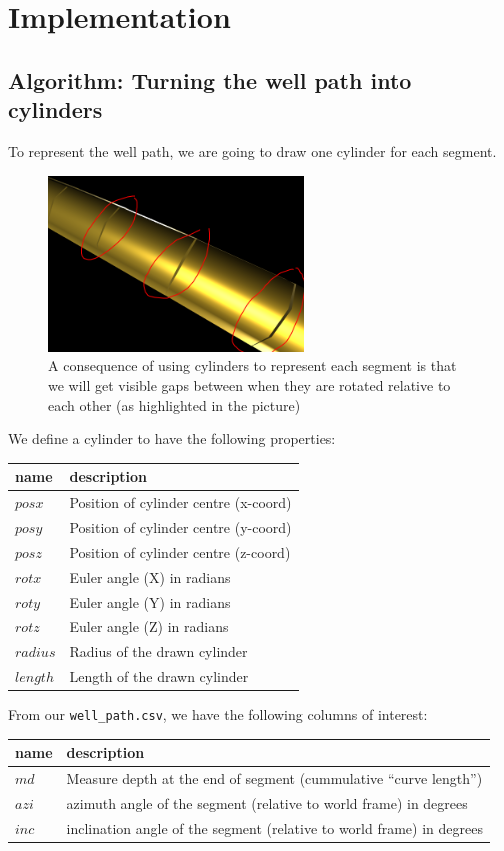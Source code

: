\hypertarget{implementation}{%
\section{Implementation}\label{implementation}}

\hypertarget{algorithm-turning-the-well-path-into-cylinders}{%
\subsection{Algorithm: Turning the well path into
cylinders}\label{algorithm-turning-the-well-path-into-cylinders}}

To represent the well path, we are going to draw one cylinder for each
segment.

\begin{figure}
\centering
\includegraphics[width=2.66667in,height=\textheight]{./cylinders.png}
\caption{A consequence of using cylinders to represent each segment is
that we will get visible gaps between when they are rotated relative to
each other (as highlighted in the picture)}
\end{figure}

We define a cylinder to have the following properties:

\begin{longtable}[]{@{}ll@{}}
\toprule
name & description\tabularnewline
\midrule
\endhead
\(posx\) & Position of cylinder centre (x-coord)\tabularnewline
\(posy\) & Position of cylinder centre (y-coord)\tabularnewline
\(posz\) & Position of cylinder centre (z-coord)\tabularnewline
\(rotx\) & Euler angle (X) in radians\tabularnewline
\(roty\) & Euler angle (Y) in radians\tabularnewline
\(rotz\) & Euler angle (Z) in radians\tabularnewline
\(radius\) & Radius of the drawn cylinder\tabularnewline
\(length\) & Length of the drawn cylinder\tabularnewline
\bottomrule
\end{longtable}

From our \texttt{well\_path.csv}, we have the following columns of
interest:

\begin{longtable}[]{@{}ll@{}}
\toprule
name & description\tabularnewline
\midrule
\endhead
\(md\) & Measure depth at the end of segment (cummulative ``curve
length'')\tabularnewline
\(azi\) & azimuth angle of the segment (relative to world frame) in
degrees\tabularnewline
\(inc\) & inclination angle of the segment (relative to world frame) in
degrees\tabularnewline
\bottomrule
\end{longtable}

